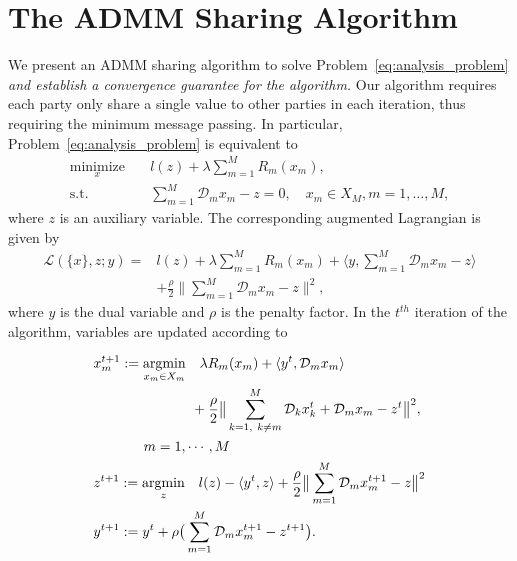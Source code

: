 \section{The ADMM Sharing Algorithm}
\label{sec:admmSharing}
We present an ADMM sharing algorithm \cite{boyd2011distributed,hong2016convergence} to solve Problem~\eqref{eq:analysis_problem} \emph{and establish a convergence guarantee for the algorithm.} Our algorithm requires each party only share a single value to other parties in each iteration, thus requiring the minimum message passing. 
In particular, Problem~\eqref{eq:analysis_problem} is equivalent to
\begin{align}
\underset{x}{\text{minimize}} &\quad l\left(z\right) + \lambda\sum_{m=1}^{M} R_m(x_m),\\
\text{s.t.} &\quad \sum_{m=1}^{M} \mathcal{D}_m x_m - z = 0,\quad x_m\in X_M, m=1,\ldots,M,
\end{align}
where $z$ is an auxiliary variable. 
The corresponding augmented Lagrangian is given by
\begin{align}
\mathcal{L}(\{x\}, z; y) =& l(z) + \lambda\sum_{m=1}^{M} R_m(x_m) + \langle y, \sum_{m=1}^{M}\mathcal{D}_m x_m - z\rangle \nonumber\\
    &+ \frac{\rho}{2}\|\sum_{m=1}^{M} \mathcal{D}_m x_m - z\|^2, \label{eq:lagragian}
\end{align}
where $y$ is the dual variable and $\rho$ is the penalty factor.
In the $t^{th}$ iteration of the algorithm, variables are updated according to

\begin{align}
&x_m^{t+1}:=\underset{x_m\in X_m}{\text{argmin}}\quad\lambda R_m(x_m) + \langle y^t, \mathcal{D}_mx_m\rangle\nonumber\\
& \quad\quad\quad\quad\quad\quad\quad+ \frac{\rho}{2}\big\|\sum_{\substack{k=1,~k\neq m}}^{M}\mathcal{D}_kx_k^{t} + \mathcal{D}_mx_m - z^t\big\|^2, \nonumber\\
&\hspace*{36pt} m=1,\cdots,M\label{eq:pal_algo_x}\\
&z^{t+1}:=\underset{z}{\text{argmin}}\quad l(z)  - \langle y^t, z \rangle + \frac{\rho}{2} \big\|\sum_{m=1}^{M}\mathcal{D}_mx_m^{t+1} - z\big\|^2\label{eq:pal_algo_z}\\
&y^{t+1}:=y^t + \rho\big(\sum_{m=1}^{M}\mathcal{D}_mx_m^{t+1} - z^{t+1}\big).\label{eq:pal_algo_y}
\end{align}

